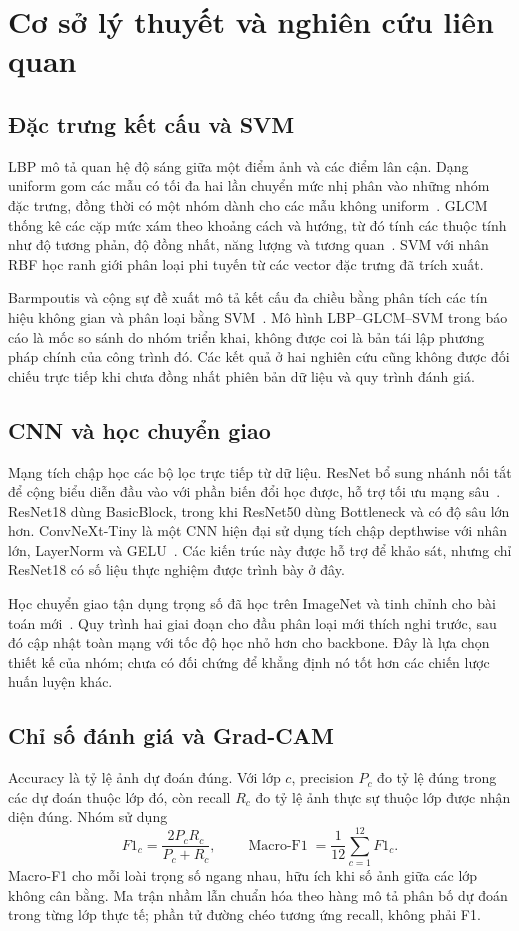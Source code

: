 \documentclass[conference]{IEEEtran}
\begin{document}
\section{Cơ sở lý thuyết và nghiên cứu liên quan}
\subsection{Đặc trưng kết cấu và SVM}
LBP mô tả quan hệ độ sáng giữa một điểm ảnh và các điểm lân cận. Dạng uniform gom các mẫu có tối đa hai lần chuyển mức nhị phân vào những nhóm đặc trưng, đồng thời có một nhóm dành cho các mẫu không uniform~\cite{ojala2002multiresolution}. GLCM thống kê các cặp mức xám theo khoảng cách và hướng, từ đó tính các thuộc tính như độ tương phản, độ đồng nhất, năng lượng và tương quan~\cite{haralick1973textural}. SVM với nhân RBF học ranh giới phân loại phi tuyến từ các vector đặc trưng đã trích xuất.

Barmpoutis và cộng sự đề xuất mô tả kết cấu đa chiều bằng phân tích các tín hiệu không gian và phân loại bằng SVM~\cite{barmpoutis2018wood}. Mô hình LBP--GLCM--SVM trong báo cáo là mốc so sánh do nhóm triển khai, không được coi là bản tái lập phương pháp chính của công trình đó. Các kết quả ở hai nghiên cứu cũng không được đối chiếu trực tiếp khi chưa đồng nhất phiên bản dữ liệu và quy trình đánh giá.

\subsection{CNN và học chuyển giao}
Mạng tích chập học các bộ lọc trực tiếp từ dữ liệu. ResNet bổ sung nhánh nối tắt để cộng biểu diễn đầu vào với phần biến đổi học được, hỗ trợ tối ưu mạng sâu~\cite{he2016deep}. ResNet18 dùng BasicBlock, trong khi ResNet50 dùng Bottleneck và có độ sâu lớn hơn. ConvNeXt-Tiny là một CNN hiện đại sử dụng tích chập depthwise với nhân lớn, LayerNorm và GELU~\cite{liu2022convnet}. Các kiến trúc này được hỗ trợ để khảo sát, nhưng chỉ ResNet18 có số liệu thực nghiệm được trình bày ở đây.

Học chuyển giao tận dụng trọng số đã học trên ImageNet và tinh chỉnh cho bài toán mới~\cite{yosinski2014how}. Quy trình hai giai đoạn cho đầu phân loại mới thích nghi trước, sau đó cập nhật toàn mạng với tốc độ học nhỏ hơn cho backbone. Đây là lựa chọn thiết kế của nhóm; chưa có đối chứng để khẳng định nó tốt hơn các chiến lược huấn luyện khác.

\subsection{Chỉ số đánh giá và Grad-CAM}
Accuracy là tỷ lệ ảnh dự đoán đúng. Với lớp $c$, precision $P_c$ đo tỷ lệ đúng trong các dự đoán thuộc lớp đó, còn recall $R_c$ đo tỷ lệ ảnh thực sự thuộc lớp được nhận diện đúng. Nhóm sử dụng
\begin{equation}
 F1_c=\frac{2P_cR_c}{P_c+R_c},\qquad
 \operatorname{Macro\text{-}F1}=\frac{1}{12}\sum_{c=1}^{12}F1_c.
\end{equation}
Macro-F1 cho mỗi loài trọng số ngang nhau, hữu ích khi số ảnh giữa các lớp không cân bằng. Ma trận nhầm lẫn chuẩn hóa theo hàng mô tả phân bố dự đoán trong từng lớp thực tế; phần tử đường chéo tương ứng recall, không phải F1.
\end{document}
